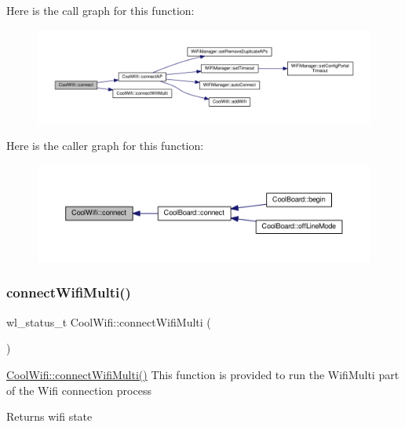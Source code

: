 Here is the call graph for this function\+:
\nopagebreak
\begin{figure}[H]
\begin{center}
\leavevmode
\includegraphics[width=350pt]{d7/d29/class_cool_wifi_ad060353050f40d032a2dbf9e54a768bf_cgraph}
\end{center}
\end{figure}
Here is the caller graph for this function\+:
\nopagebreak
\begin{figure}[H]
\begin{center}
\leavevmode
\includegraphics[width=350pt]{d7/d29/class_cool_wifi_ad060353050f40d032a2dbf9e54a768bf_icgraph}
\end{center}
\end{figure}
\mbox{\label{class_cool_wifi_a419de92d738f14b7444cf822b3ab0070}} 
\subsubsection{\texorpdfstring{connect\+Wifi\+Multi()}{connectWifiMulti()}}
{\footnotesize\ttfamily wl\+\_\+status\+\_\+t Cool\+Wifi\+::connect\+Wifi\+Multi (\begin{DoxyParamCaption}{ }\end{DoxyParamCaption})}

\hyperlink{class_cool_wifi_a419de92d738f14b7444cf822b3ab0070}{Cool\+Wifi\+::connect\+Wifi\+Multi()} This function is provided to run the Wifi\+Multi part of the Wifi connection process

\begin{DoxyReturn}{Returns}
wifi state 
\end{DoxyReturn}


